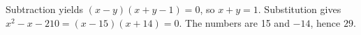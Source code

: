 Subtraction yields $(x-y)(x+y-1)=0$, so $x+y=1$. Substitution gives $x^2-x-210=(x-15)(x+14)=0$. The numbers are 15 and $-14$, hence $\boxed{29}$.
